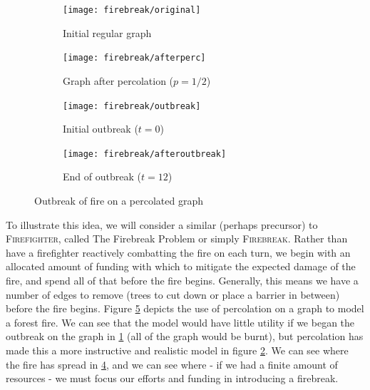 \documentclass[../report.tex]{subfiles}
\begin{document}
\begin{figure}[!ht] 
\begin{centering}
  \begin{subfigure}{0.4\linewidth}
    \centering
    \texttt{[image: firebreak/original]} 
    \caption{Initial regular graph} 
    \label{fig:original} 
    \vspace{4ex}
  \end{subfigure}%
  \begin{subfigure}{0.4\linewidth}
    \centering
    \texttt{[image: firebreak/afterperc]} 
    \caption{Graph after percolation ($p=1/2$)} 
    \label{fig:afterperc} 
    \vspace{4ex}
  \end{subfigure} 
  \begin{subfigure}{0.4\linewidth}
    \centering
    \texttt{[image: firebreak/outbreak]} 
    \caption{Initial outbreak ($t=0$)} 
    \label{fig:outbreak} 
  \end{subfigure}%
  \begin{subfigure}{0.4\linewidth}
    \centering
    \texttt{[image: firebreak/afteroutbreak]} 
    \caption{End of outbreak ($t=12$)} 
    \label{fig:end} 
  \end{subfigure} 
  \caption{Outbreak of fire on a percolated graph}
  \label{fig:percolated_graph} 
  \end{centering}
\end{figure}

To illustrate this idea, we will consider a similar (perhaps precursor) to {\scshape Firefighter}, called The Firebreak Problem or simply {\scshape Firebreak}. Rather than have a firefighter reactively combatting the fire on each turn, we begin with an allocated amount of funding with which to mitigate the expected damage of the fire, and spend all of that before the fire begins. Generally, this means we have a number of edges to remove (trees to cut down or place a barrier in between) before the fire begins. Figure \ref{fig:percolated_graph} depicts the use of percolation on a graph to model a forest fire. We can see that the model would have little utility if we began the outbreak on the graph in \ref{fig:original} (all of the graph would be burnt), but percolation has made this a more instructive and realistic model in figure \ref{fig:afterperc}. We can see where the fire has spread in \ref{fig:end}, and we can see where - if we had a finite amount of resources - we must focus our efforts and funding in introducing a firebreak.
\end{document}
